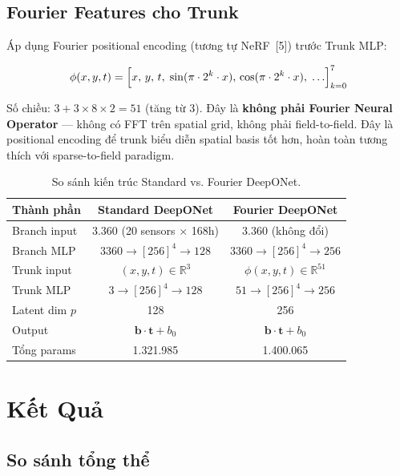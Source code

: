 \documentclass[12pt,a4paper]{article}
\begin{document}
\subsection{Fourier Features cho Trunk}

Áp dụng Fourier positional encoding (tương tự NeRF~[5]) trước Trunk MLP:

\begin{equation}
  \phi(x, y, t) = \Bigl[x,\, y,\, t,\; \sin(\pi \cdot 2^k \cdot x),\, \cos(\pi \cdot 2^k \cdot x),\; \ldots\Bigr]_{k=0}^{7}
\end{equation}

Số chiều: $3 + 3 \times 8 \times 2 = 51$ (tăng từ 3). Đây là \textbf{không phải Fourier Neural Operator} --- không có FFT trên spatial grid, không phải field-to-field. Đây là positional encoding để trunk biểu diễn spatial basis tốt hơn, hoàn toàn tương thích với sparse-to-field paradigm.

\begin{table}[ht]
  \centering
  \caption{So sánh kiến trúc Standard vs. Fourier DeepONet.}
  \label{tab:architecture}
  \begin{tabular}{@{}lcc@{}}
    \toprule
    \textbf{Thành phần} & \textbf{Standard DeepONet} & \textbf{Fourier DeepONet} \\
    \midrule
    Branch input & 3.360 (20 sensors $\times$ 168h) & 3.360 (không đổi) \\
    Branch MLP & $3360 \to [256]^4 \to 128$ & $3360 \to [256]^4 \to 256$ \\
    Trunk input & $(x,y,t) \in \mathbb{R}^3$ & $\phi(x,y,t) \in \mathbb{R}^{51}$ \\
    Trunk MLP & $3 \to [256]^4 \to 128$ & $51 \to [256]^4 \to 256$ \\
    Latent dim $p$ & 128 & 256 \\
    Output & $\mathbf{b} \cdot \mathbf{t} + b_0$ & $\mathbf{b} \cdot \mathbf{t} + b_0$ \\
    \midrule
    Tổng params & 1.321.985 & 1.400.065 \\
    \bottomrule
  \end{tabular}
\end{table}

\section{Kết Quả}

\subsection{So sánh tổng thể}
\end{document}

